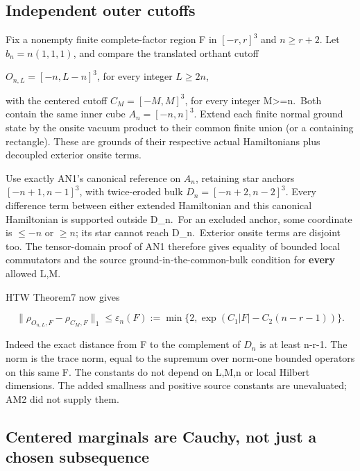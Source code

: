 \hypertarget{r29-an2-independent-outer-cutoffs}{%
\subsection{Independent outer cutoffs}\label{r29:an2:r29-an2-independent-outer-cutoffs}}

Fix a nonempty finite complete-factor region F in \([-r,r]^{3}\) and \(n\ge r+2\). Let \(b_n=n(1,1,1)\), and compare the translated orthant cutoff

\(O_{n,L}=[-n,L-n]^3\), for every integer \(L\ge 2n\),

with the centered cutoff \(C_M=[-M,M]^3\), for every integer M\textgreater=n.~Both contain the same inner cube \(A_n=[-n,n]^{3}\). Extend each finite normal ground state by the onsite vacuum product to their common finite union (or a containing rectangle). These are grounds of their respective actual Hamiltonians plus decoupled exterior onsite terms.

Use exactly AN1's canonical reference on \(A_n\), retaining star anchors \([-n+1,n-1]^{3}\), with twice-eroded bulk \(D_n=[-n+2,n-2]^{3}\). Every difference term between either extended Hamiltonian and this canonical Hamiltonian is supported outside D\_n.~For an excluded anchor, some coordinate is \(\le -n\) or \(\ge n\); its star cannot reach D\_n.~Exterior onsite terms are disjoint too. The tensor-domain proof of AN1 therefore gives equality of bounded local commutators and the source ground-in-the-common-bulk condition for \textbf{every} allowed L,M.

HTW Theorem7 now gives

\begin{equation}
\|\rho_{O_{n,L},F}-\rho_{C_M,F}\|_1
\le \varepsilon_n(F):=
\min\{2,\exp(C_1|F|-C_2(n-r-1))\}.
\tag{HNM-AN2.1}
\label{r29:an2:eq1}
\end{equation}

Indeed the exact distance from F to the complement of \(D_n\) is at least n-r-1. The norm is the trace norm, equal to the supremum over norm-one bounded operators on this same F. The constants do not depend on L,M,n or local Hilbert dimensions. The added smallness and positive source constants are unevaluated; AM2 did not supply them.

\hypertarget{r29-an2-centered-marginals-are-cauchy-not-just-a-chosen-subsequence}{%
\subsection{Centered marginals are Cauchy, not just a chosen subsequence}\label{r29:an2:r29-an2-centered-marginals-are-cauchy-not-just-a-chosen-subsequence}}

